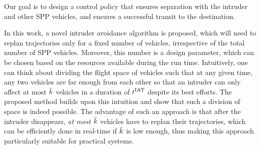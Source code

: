 Our goal is to design a control policy that ensures separation with the intruder and other SPP vehicles, and ensures a successful transit to the destination. %

In this work, a novel intruder avoidance algorithm is proposed, which will need to replan trajectories only for a fixed number of vehicles, irrespective of the total number of SPP vehicles. Moreover, this number is a design parameter, which can be chosen based on the resources available during the run time. Intuitively, one can think about dividing the flight space of vehicles such that at any given time, any two vehicles are far enough from each other so that an intruder can only affect at most $\bar{k}$ vehicles in a duration of $t^\text{IAT}$ despite its best efforts. The proposed method builds upon this intuition and show that such a division of space is indeed possible. The advantage of such an approach is that after the intruder disappears, \textit{at most $\bar{k}$} vehicles have to replan their trajectories, which can be efficiently done in real-time if $\bar{k}$ is low enough, thus making this approach particularly suitable for practical systems. %

